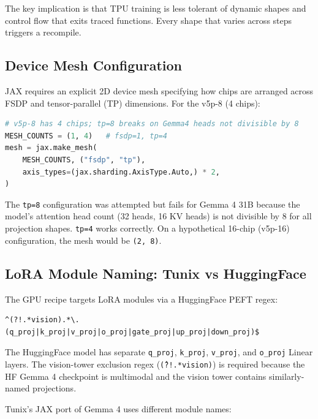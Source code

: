 \documentclass[11pt,a4paper]{article}
\begin{document}
The key implication is that TPU training is less tolerant of dynamic shapes and control flow that exits traced functions. Every shape that varies across steps triggers a recompile.

\subsection{Device Mesh Configuration}

JAX requires an explicit 2D device mesh specifying how chips are arranged across FSDP and tensor-parallel (TP) dimensions. For the v5p-8 (4 chips):

\begin{lstlisting}[language=python]
# v5p-8 has 4 chips; tp=8 breaks on Gemma4 heads not divisible by 8
MESH_COUNTS = (1, 4)   # fsdp=1, tp=4
mesh = jax.make_mesh(
    MESH_COUNTS, ("fsdp", "tp"),
    axis_types=(jax.sharding.AxisType.Auto,) * 2,
)
\end{lstlisting}

The \texttt{tp=8} configuration was attempted but fails for Gemma 4 31B because the model's attention head count (32 heads, 16 KV heads) is not divisible by 8 for all projection shapes. \texttt{tp=4} works correctly. On a hypothetical 16-chip (v5p-16) configuration, the mesh would be \texttt{(2, 8)}.

\subsection{LoRA Module Naming: Tunix vs HuggingFace}

The GPU recipe targets LoRA modules via a HuggingFace PEFT regex:
\begin{lstlisting}
^(?!.*vision).*\.(q_proj|k_proj|v_proj|o_proj|gate_proj|up_proj|down_proj)$
\end{lstlisting}

The HuggingFace model has separate \texttt{q\_proj}, \texttt{k\_proj}, \texttt{v\_proj}, and \texttt{o\_proj} Linear layers. The vision-tower exclusion regex (\texttt{\^(?!.*vision)}) is required because the HF Gemma 4 checkpoint is multimodal and the vision tower contains similarly-named projections.

Tunix's JAX port of Gemma 4 uses different module names:
\end{document}
